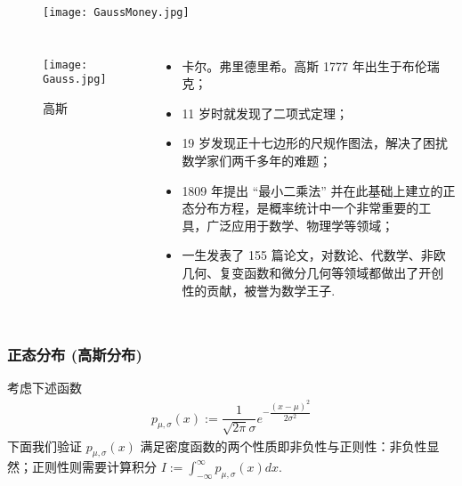 \begin{frame}
	\begin{figure}[htbp]
		\centering
		\texttt{[image: GaussMoney.jpg]}
	\end{figure}
\end{frame}

\begin{frame}
	\begin{columns}
		\column{4cm}
		\begin{figure}[htbp]\nonumber
			\centering
			\texttt{[image: Gauss.jpg]}
			\caption{高斯}
		\end{figure}
		\column{6cm}
		\begin{itemize}[<+-|alert@+>]
			\item 卡尔。弗里德里希。高斯 1777 年出生于布伦瑞克；
			\item 11 岁时就发现了二项式定理；
			\item 19 岁发现正十七边形的尺规作图法，解决了困扰数学家们两千多年的难题；
			\item 1809 年提出 “最小二乘法” 并在此基础上建立的正态分布方程，是概率统计中一个非常重要的工具，广泛应用于数学、物理学等领域；
			\item 一生发表了 155 篇论文，对数论、代数学、非欧几何、复变函数和微分几何等领域都做出了开创性的贡献，被誉为数学王子.
		\end{itemize}
	\end{columns}
\end{frame}
\begin{frame}
	\frametitle{正态分布 (高斯分布)}
	考虑下述函数
	\begin{eqnarray*}
		p_{\mu,\sigma}(x):=\dfrac{1}{\sqrt{2\pi}\sigma}e^{-\dfrac{(x-\mu)^2}{2\sigma^2}}
	\end{eqnarray*}
	\pause 下面我们验证 $p_{\mu,\sigma}(x)$ 满足密度函数的两个性质即非负性与正则性：非负性显然；正则性则需要计算积分 $I:=\int_{-\infty}^\infty p_{\mu,\sigma}(x) dx$.
\end{frame}

